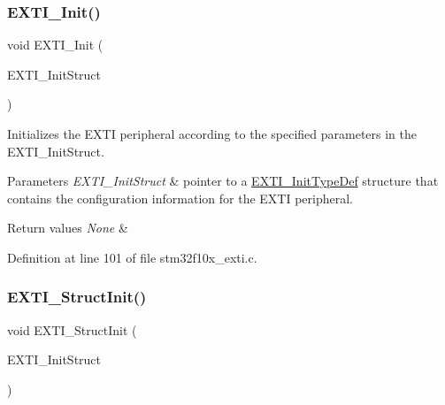 \mbox{\label{group___e_x_t_i___private___functions_ga8c9ce6352a3a2dfc8fc9287cb24c6501}} 
\subsubsection{\texorpdfstring{E\+X\+T\+I\+\_\+\+Init()}{EXTI\_Init()}}
{\footnotesize\ttfamily void E\+X\+T\+I\+\_\+\+Init (\begin{DoxyParamCaption}\item[{\hyperlink{struct_e_x_t_i___init_type_def}{E\+X\+T\+I\+\_\+\+Init\+Type\+Def} $\ast$}]{E\+X\+T\+I\+\_\+\+Init\+Struct }\end{DoxyParamCaption})}



Initializes the E\+X\+TI peripheral according to the specified parameters in the E\+X\+T\+I\+\_\+\+Init\+Struct. 


\begin{DoxyParams}{Parameters}
{\em E\+X\+T\+I\+\_\+\+Init\+Struct} & pointer to a \hyperlink{struct_e_x_t_i___init_type_def}{E\+X\+T\+I\+\_\+\+Init\+Type\+Def} structure that contains the configuration information for the E\+X\+TI peripheral. \\
\hline
\end{DoxyParams}

\begin{DoxyRetVals}{Return values}
{\em None} & \\
\hline
\end{DoxyRetVals}


Definition at line 101 of file stm32f10x\+\_\+exti.\+c.

\mbox{\label{group___e_x_t_i___private___functions_ga86b9e662d18a2f829999cfb26aa7ca20}} 
\subsubsection{\texorpdfstring{E\+X\+T\+I\+\_\+\+Struct\+Init()}{EXTI\_StructInit()}}
{\footnotesize\ttfamily void E\+X\+T\+I\+\_\+\+Struct\+Init (\begin{DoxyParamCaption}\item[{\hyperlink{struct_e_x_t_i___init_type_def}{E\+X\+T\+I\+\_\+\+Init\+Type\+Def} $\ast$}]{E\+X\+T\+I\+\_\+\+Init\+Struct }\end{DoxyParamCaption})}



